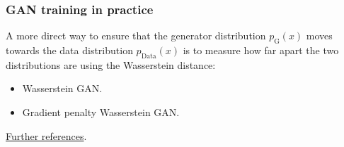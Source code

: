 \documentclass{beamer}
\begin{document}
\begin{frame}
    \frametitle{GAN training in practice}
    A more direct way to ensure that the generator distribution $p_{\textrm{G}}(x)$ moves towards the data distribution $p_{\textrm{Data}}(x)$ is to measure how far apart the two distributions are using the Wasserstein distance:
    \begin{itemize}
        \item Wasserstein GAN.
        \item Gradient penalty Wasserstein GAN.
    \end{itemize}
    \href{https://lilianweng.github.io/posts/2017-08-20-gan/}{Further references}.
\end{frame}
\end{document}
